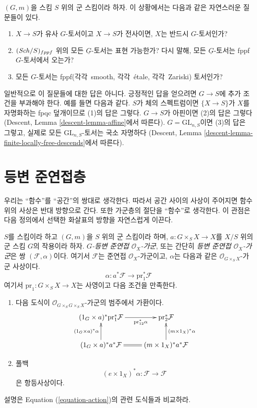 \begin{remark}
\label{remark-fun-with-torsors}
$(G, m)$을 스킴 $S$ 위의 군 스킴이라 하자. 이 상황에서는 다음과 같은 자연스러운 질문들이 있다.
\begin{enumerate}
\item $X \to S$가 유사 $G$-토서이고 $X \to S$가 전사이면, $X$는 반드시 $G$-토서인가?
\item $(\mathit{Sch}/S)_{fppf}$ 위의 모든 $\underline{G}$-토서는 표현 가능한가? 다시 말해, 모든 $\underline{G}$-토서는
fppf $G$-토서에서 오는가?
\item 모든 $G$-토서는 fppf(각각\ smooth, 각각\ \'etale, 각각\ Zariski) 토서인가?
\end{enumerate}
일반적으로 이 질문들에 대한 답은 아니다. 긍정적인 답을 얻으려면 $G \to S$에 추가 조건을 부과해야 한다.
예를 들면 다음과 같다. $S$가 체의 스펙트럼이면 $\{X \to S\}$가 $X$를 자명화하는 fpqc 덮개이므로 (1)의 답은 그렇다.
$G \to S$가 아핀이면 (2)의 답은 그렇다(Descent, Lemma \ref{descent-lemma-affine}에서 따른다).
$G = \text{GL}_{n, S}$이면 (3)의 답은 그렇고, 실제로 모든 $\text{GL}_{n, S}$-토서는 국소 자명하다
(Descent, Lemma \ref{descent-lemma-finite-locally-free-descends}에서 따른다).
\end{remark}



\section{등변 준연접층}
\label{section-equivariant}

\noindent
우리는 ``함수''를 ``공간''의 쌍대로 생각한다. 따라서 공간 사이의 사상이 주어지면 함수 위의 사상은 반대 방향으로 간다.
또한 가군층의 절단을 ``함수''로 생각한다. 이 관점은 다음 정의에서 선택한 화살표의 방향을 자연스럽게 이끈다.

\begin{definition}
\label{definition-equivariant-module}
$S$를 스킴이라 하고 $(G, m)$을 $S$ 위의 군 스킴이라 하며,
$a : G \times_S X \to X$를 $X/S$ 위의 군 스킴 $G$의 작용이라 하자.
{\it $G$-등변 준연접 $\mathcal{O}_X$-가군}, 또는 간단히 {\it 등변 준연접 $\mathcal{O}_X$-가군}은
쌍 $(\mathcal{F}, \alpha)$이다. 여기서 $\mathcal{F}$는 준연접 $\mathcal{O}_X$-가군이고, $\alpha$는
다음과 같은 $\mathcal{O}_{G \times_S X}$-가군 사상이다.
$$
\alpha : a^*\mathcal{F} \longrightarrow \text{pr}_1^*\mathcal{F}
$$
여기서 $\text{pr}_1 : G \times_S X \to X$는 사영이고 다음 조건을 만족한다.
\begin{enumerate}
\item 다음 도식이 $\mathcal{O}_{G \times_S G \times_S X}$-가군의 범주에서 가환이다.
$$
\xymatrix{
(1_G \times a)^*\text{pr}_1^*\mathcal{F} \ar[r]_-{\text{pr}_{12}^*\alpha} &
\text{pr}_2^*\mathcal{F} \\
(1_G \times a)^*a^*\mathcal{F} \ar[u]^{(1_G \times a)^*\alpha} \ar@{=}[r] &
(m \times 1_X)^*a^*\mathcal{F} \ar[u]_{(m \times 1_X)^*\alpha}
}
$$
\item 풀백
$$
(e \times 1_X)^*\alpha : \mathcal{F} \longrightarrow \mathcal{F}
$$
은 항등사상이다.
\end{enumerate}
설명은 Equation (\ref{equation-action})의 관련 도식들과 비교하라.
\end{definition}

